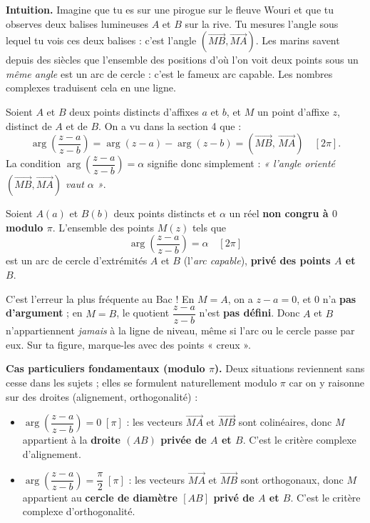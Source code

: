 \documentclass[11pt]{article}
\newcommand{\cle}[1]{{\popxbold\color{popdark}#1}}
\newcounter{popsec}
\newcounter{popsub}
\newcommand{\courssub}[1]{%
  \stepcounter{popsub}%
  \par\vspace{9pt}\noindent{\popxbold\fontsize{11.5}{13}\selectfont\color{popink}{\color{poporange}\thepopsec.\thepopsub}\hspace{6pt}#1}\par\nopagebreak\vspace{4pt}
}
\begin{document}
\courssub{Lignes de niveau $\arg\left(\dfrac{z-a}{z-b}\right) = \alpha$}

\textbf{Intuition.} Imagine que tu es sur une pirogue sur le fleuve Wouri et que tu observes deux balises lumineuses $A$ et $B$ sur la rive. Tu mesures l'angle sous lequel tu vois ces deux balises : c'est l'angle $(\overrightarrow{MB}, \overrightarrow{MA})$. Les marins savent depuis des siècles que l'ensemble des positions d'où l'on voit deux points sous un \emph{même angle} est un arc de cercle : c'est le fameux \cle{arc capable}. Les nombres complexes traduisent cela en une ligne.

Soient $A$ et $B$ deux points distincts d'affixes $a$ et $b$, et $M$ un point d'affixe $z$, distinct de $A$ et de $B$. On a vu dans la section 4 que :
\[
\arg\left(\frac{z-a}{z-b}\right) = \arg(z-a) - \arg(z-b) = \left(\overrightarrow{MB},\, \overrightarrow{MA}\right) \quad [2\pi].
\]
La condition $\arg\left(\dfrac{z-a}{z-b}\right) = \alpha$ signifie donc simplement : \emph{« l'angle orienté $(\overrightarrow{MB}, \overrightarrow{MA})$ vaut $\alpha$ »}.

\begin{propriete}
Soient $A(a)$ et $B(b)$ deux points distincts et $\alpha$ un réel \textbf{non congru à $0$ modulo $\pi$}. L'ensemble des points $M(z)$ tels que
\[
\arg\left(\frac{z-a}{z-b}\right) = \alpha \quad [2\pi]
\]
est un \cle{arc de cercle} d'extrémités $A$ et $B$ (l'\emph{arc capable}), \textbf{privé des points $A$ et $B$}.
\end{propriete}

\begin{attention}
C'est l'erreur la plus fréquente au Bac ! En $M = A$, on a $z - a = 0$, et $0$ n'a \textbf{pas d'argument} ; en $M = B$, le quotient $\dfrac{z-a}{z-b}$ n'est \textbf{pas défini}. Donc $A$ et $B$ n'appartiennent \emph{jamais} à la ligne de niveau, même si l'arc ou le cercle passe par eux. Sur ta figure, marque-les avec des points « creux ».
\end{attention}

\textbf{Cas particuliers fondamentaux (modulo $\pi$).} Deux situations reviennent sans cesse dans les sujets ; elles se formulent naturellement modulo $\pi$ car on y raisonne sur des droites (alignement, orthogonalité) :

\begin{itemize}
\item $\arg\left(\dfrac{z-a}{z-b}\right) = 0 \;[\pi]$ : les vecteurs $\overrightarrow{MA}$ et $\overrightarrow{MB}$ sont colinéaires, donc $M$ appartient à la \textbf{droite $(AB)$ privée de $A$ et $B$}. C'est le critère complexe d'\cle{alignement}.
\item $\arg\left(\dfrac{z-a}{z-b}\right) = \dfrac{\pi}{2} \;[\pi]$ : les vecteurs $\overrightarrow{MA}$ et $\overrightarrow{MB}$ sont orthogonaux, donc $M$ appartient au \textbf{cercle de diamètre $[AB]$ privé de $A$ et $B$}. C'est le critère complexe d'\cle{orthogonalité}.
\end{itemize}
\end{document}

